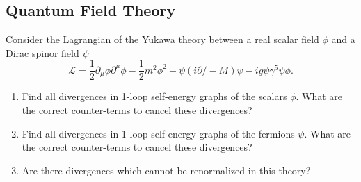 \subsection{Quantum Field Theory}

\begin{exercise}
\label{physics:2024:6}
Consider the Lagrangian of the Yukawa theory between a real scalar field $\phi$ and a Dirac spinor field $\psi$
\begin{equation}
    \mathcal{L} = \frac{1}{2} \partial_\mu \phi \partial^\mu \phi - \frac{1}{2} m^2 \phi^2 + \bar{\psi} (i \partial\!\!\!/ - M) \psi - i g \bar{\psi} \gamma^5 \psi \phi. \label{eq:2024:6:12}
\end{equation}

\begin{enumerate}[label=(\alph*)]
    \item Find all divergences in 1-loop self-energy graphs of the scalars $\phi$. What are the correct counter-terms to cancel these divergences?
    \item Find all divergences in 1-loop self-energy graphs of the fermions $\psi$. What are the correct counter-terms to cancel these divergences?
    \item Are there divergences which cannot be renormalized in this theory?
\end{enumerate}
\end{exercise}

